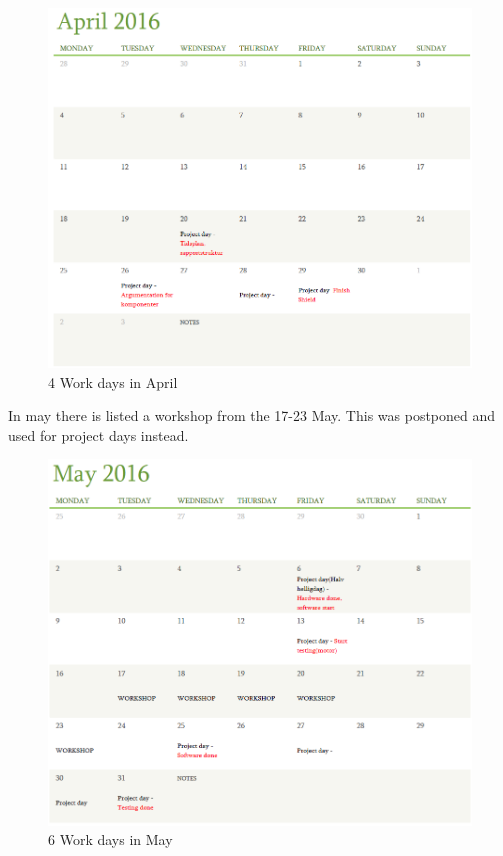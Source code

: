 \begin{figure}[h!]
  \centering
  \includegraphics[width=1.1\textwidth]{figures/april.png}
  
  \caption{4 Work days in April}
  \label{Time Schedule}
\end{figure}

In may there is listed a workshop from the 17-23 May. This was postponed and used for project days instead.
\begin{figure}[h!]
  \centering
  \includegraphics[width=1.1\textwidth]{figures/may.png}
  
  \caption{6 Work days in May}
  \label{Time Schedule}
\end{figure}

